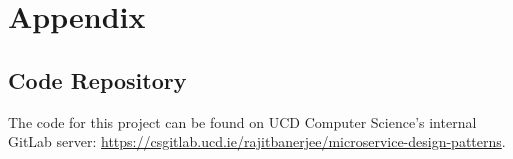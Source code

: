 \chapter{Appendix}


\section{Code Repository}

The code for this project can be found on UCD Computer Science's internal GitLab server: \url{https://csgitlab.ucd.ie/rajitbanerjee/microservice-design-patterns}.



